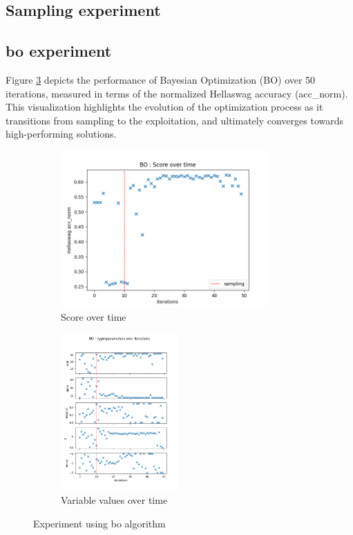 \subsection{Sampling experiment}
\label{sec:sampling}



\subsection{\acrshort{bo} experiment}
\label{sec:bo_exp}
Figure \ref{fig:exp12_res} depicts the performance of Bayesian Optimization (BO) over 50 iterations, measured in terms of the normalized Hellaswag accuracy (acc\_norm). This visualization highlights the evolution of the optimization process as it transitions from sampling to the exploitation, and ultimately converges towards high-performing solutions.


\begin{figure}[h!]
    \centering
    \begin{subfigure}[b]{.45\textwidth}
      \centering
      \includegraphics[height = 6cm]{assets/img/chap_4/experiments/plots/exp12_score_over_time.png}
      \caption{Score over time}
      \label{fig:exp12_score_time}
    \end{subfigure}%
    \begin{subfigure}[b]{.45\textwidth}
      \centering
      \includegraphics[height = 6cm]{assets/img/chap_4/experiments/plots/exp12_variables_over_time.png}
      \caption{Variable values over time}
      \label{fig:exp12_var_time}
    \end{subfigure}
    \caption{Experiment using \acrshort{bo} algorithm}
    \label{fig:exp12_res}
\end{figure}

